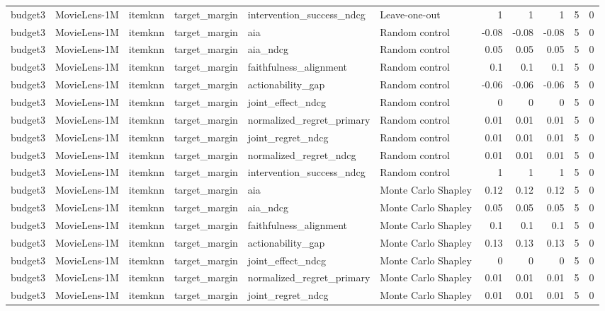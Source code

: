 \begin{table}[t]
{\begin{tabular}{llllllrrrrr}
budget3 & MovieLens-1M & itemknn & target\_margin & intervention\_success\_ndcg & Leave-one-out & 1 & 1 & 1 & 5 & 0 \\
budget3 & MovieLens-1M & itemknn & target\_margin & aia & Random control & -0.08 & -0.08 & -0.08 & 5 & 0 \\
budget3 & MovieLens-1M & itemknn & target\_margin & aia\_ndcg & Random control & 0.05 & 0.05 & 0.05 & 5 & 0 \\
budget3 & MovieLens-1M & itemknn & target\_margin & faithfulness\_alignment & Random control & 0.1 & 0.1 & 0.1 & 5 & 0 \\
budget3 & MovieLens-1M & itemknn & target\_margin & actionability\_gap & Random control & -0.06 & -0.06 & -0.06 & 5 & 0 \\
budget3 & MovieLens-1M & itemknn & target\_margin & joint\_effect\_ndcg & Random control & 0 & 0 & 0 & 5 & 0 \\
budget3 & MovieLens-1M & itemknn & target\_margin & normalized\_regret\_primary & Random control & 0.01 & 0.01 & 0.01 & 5 & 0 \\
budget3 & MovieLens-1M & itemknn & target\_margin & joint\_regret\_ndcg & Random control & 0.01 & 0.01 & 0.01 & 5 & 0 \\
budget3 & MovieLens-1M & itemknn & target\_margin & normalized\_regret\_ndcg & Random control & 0.01 & 0.01 & 0.01 & 5 & 0 \\
budget3 & MovieLens-1M & itemknn & target\_margin & intervention\_success\_ndcg & Random control & 1 & 1 & 1 & 5 & 0 \\
budget3 & MovieLens-1M & itemknn & target\_margin & aia & Monte Carlo Shapley & 0.12 & 0.12 & 0.12 & 5 & 0 \\
budget3 & MovieLens-1M & itemknn & target\_margin & aia\_ndcg & Monte Carlo Shapley & 0.05 & 0.05 & 0.05 & 5 & 0 \\
budget3 & MovieLens-1M & itemknn & target\_margin & faithfulness\_alignment & Monte Carlo Shapley & 0.1 & 0.1 & 0.1 & 5 & 0 \\
budget3 & MovieLens-1M & itemknn & target\_margin & actionability\_gap & Monte Carlo Shapley & 0.13 & 0.13 & 0.13 & 5 & 0 \\
budget3 & MovieLens-1M & itemknn & target\_margin & joint\_effect\_ndcg & Monte Carlo Shapley & 0 & 0 & 0 & 5 & 0 \\
budget3 & MovieLens-1M & itemknn & target\_margin & normalized\_regret\_primary & Monte Carlo Shapley & 0.01 & 0.01 & 0.01 & 5 & 0 \\
budget3 & MovieLens-1M & itemknn & target\_margin & joint\_regret\_ndcg & Monte Carlo Shapley & 0.01 & 0.01 & 0.01 & 5 & 0 \\

\end{tabular}}
\end{table}
